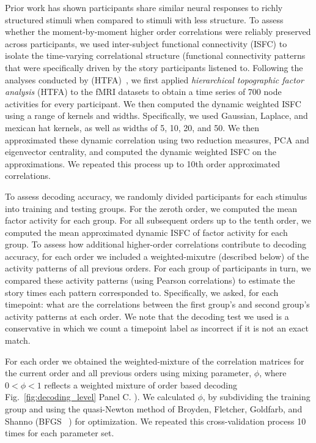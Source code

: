 \documentclass[english]{article}
\begin{document}
Prior work has shown participants share similar neural responses to
richly structured stimuli when compared to stimuli with less
structure.  To assess whether the moment-by-moment higher order
correlations were reliably preserved across participants, we used
inter-subject functional connectivity (ISFC) to isolate the
time-varying correlational structure (functional connectivity patterns
that were specifically driven by the story participants listened to.
Following the analyses conducted by (HTFA)~\cite{MannEtal18}, we first
applied \textit{hierarchical topographic factor analysis} (HTFA) to
the fMRI datasets to obtain a time series of 700 node activities for
every participant.  We then computed the dynamic weighted ISFC using a
range of kernels and widths.  Specifically, we used Gaussian, Laplace,
and mexican hat kernels, as well as widths of 5, 10, 20, and 50.  We
then approximated these dynamic correlation using two reduction measures, PCA and eigenvector centrality, and computed the dynamic weighted ISFC on the approximations.  We repeated this process up to 10th order approximated correlations.  

To assess decoding accuracy, we randomly divided participants for each
stimulus into training and testing groups. For the zeroth order, we
computed the mean factor activity for each group.  For all subsequent
orders up to the tenth order, we computed the mean approximated
dynamic ISFC of factor activity for each group. To assess how
additional higher-order correlations contribute to decoding accuracy,
for each order we included a weighted-mixutre (described below) of the activity patterns of all
previous orders.  For each group of participants in turn, we compared these activity patterns (using Pearson correlations) to estimate the story times each pattern corresponded to. Specifically, we asked, for each timepoint: what are the correlations
between the first group's and second group's activity patterns at each
order. We note that the decoding test we used is a conservative in which we count a timepoint label as incorrect if it is not an exact match.

For each order we obtained the weighted-mixture of the correlation
matrices for the current order and all previous orders using mixing parameter, $\phi$, where $0 <\phi< 1$ reflects a
weighted mixture of order based decoding Fig.~\ref{fig:decoding_level}
Panel C. ). We calculated  $\phi$, by
subdividing the training group and using the quasi-Newton method of
Broyden, Fletcher, Goldfarb, and Shanno (BFGS ~\citep{NoceWrig06}) for optimization. We
repeated this cross-validation process 10 times for each parameter set. 
\end{document}
